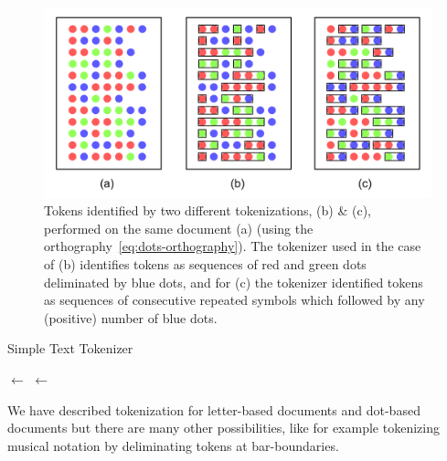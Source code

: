 \begin{figure}[H]
  \centering
  \captionsetup{width=.91\linewidth}
  \includegraphics[scale=0.70]{figures/affinity-designer/tokens.png}
  \caption{Tokens identified by two different tokenizations, (b) \& (c), performed on the same document (a) (using the orthography~\eqref{eq:dots-orthography}). The tokenizer used in the case of (b) identifies tokens as sequences of red and green dots deliminated by blue dots, and for (c) the tokenizer identified tokens as sequences of consecutive repeated symbols which followed by any (positive) number of blue dots.}\label{fig:dot-tokenizers}
\end{figure}
\par
\begin{algorithm}
  {\small
  \caption{Simple Text Tokenizer}\label{alg:simple-tokenizer}
  \SetNoFillComment{}
  \DontPrintSemicolon{}

  \BlankLine

  \Tokens $\leftarrow$ \List{}\;
  \NextToken $\leftarrow$ \List{}\;
  \Return{\Tokens}
  }
\end{algorithm}
\par
We have described tokenization for letter-based documents and dot-based documents but there are many other possibilities, like for example tokenizing musical notation by deliminating tokens at bar-boundaries.

